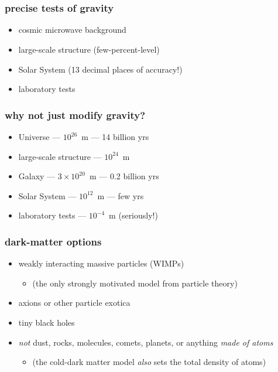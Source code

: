 \documentclass{beamer}
\begin{document}
{\begin{frame}[plain]~\end{frame}}

{\begin{frame}[plain]~\end{frame}}

\begin{frame}
\frametitle{precise tests of gravity}
\begin{itemize}
\item cosmic microwave background
\item large-scale structure (few-percent-level)
\item Solar System (13 decimal places of accuracy!)
\item laboratory tests
\end{itemize}
\end{frame}

\begin{frame}
\frametitle{why not just modify gravity?}
\begin{itemize}
\item Universe --- $10^{26}$~m --- 14 billion yrs
\item large-scale structure --- $10^{24}$~m
\item Galaxy --- $3\times 10^{20}$~m --- 0.2 billion yrs
\item Solar System --- $10^{12}$~m --- few yrs
\item laboratory tests --- $10^{-4}$~m (seriously!)
\end{itemize}
\end{frame}

\begin{frame}
\frametitle{dark-matter options}
\begin{itemize}
\item weakly interacting massive particles (WIMPs)
  \begin{itemize}
  \item (the only strongly motivated model from particle theory)
  \end{itemize}
\item axions or other particle exotica
\item tiny black holes
\item \emph{not} dust, rocks, molecules, comets, planets, or anything \emph{made of atoms}
  \begin{itemize}
  \item (the cold-dark matter model \emph{also} sets the total density of atoms)
  \end{itemize}
\end{itemize}
\end{frame}
\end{document}

